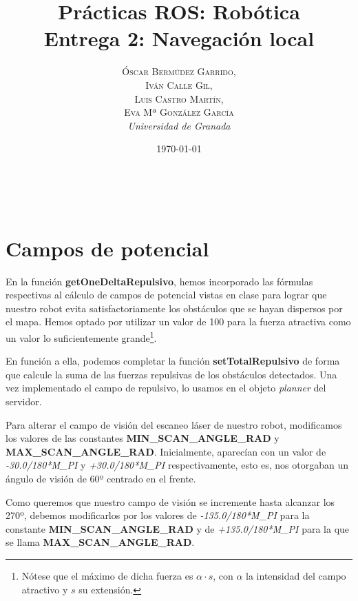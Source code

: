 \documentclass[a4paper, 11pt]{article}
\title{\textbf{Prácticas ROS: Robótica}\\ %
Entrega 2: Navegación local} %
\author{\textsc{Óscar Bermúdez Garrido,\\Iván Calle Gil,\\ Luis Castro Martín,\\ Eva Mª González García} %
\\{\textit{Universidad de Granada}}} %
\date{\today} %
\makeatletter
\renewcommand{\maketitle}{
  \begin{flushright} %
  
  {\LARGE\@title} %
  
  \vspace{50pt} %
  
  {\large\@author} %
  \\\@date %
  \vspace{40pt} %
  \end{flushright}
}
\makeatother
\begin{document}
\maketitle %

\renewcommand{\abstractname}{Resumen} %
\begin{abstract}
	
\end{abstract}


{\parskip=2pt
  \tableofcontents
}
\pagebreak


\section{Campos de potencial}
	En la función \textbf{getOneDeltaRepulsivo}, hemos incorporado las fórmulas respectivas al cálculo
	de campos de potencial vistas en clase para lograr que nuestro robot evita satisfactoriamente los
	obstáculos que se hayan dispersos por el mapa. Hemos optado por utilizar un valor de 100  para
	la fuerza atractiva como un valor lo suficientemente grande\footnote{Nótese que el máximo de dicha
	fuerza es $\alpha \cdot s$, con $\alpha$ la intensidad del campo atractivo y $s$ su extensión.}.
	
	En función a ella, podemos completar la función \textbf{setTotalRepulsivo} de forma que calcule la
	suma de las fuerzas repulsivas de los obstáculos detectados. Una vez implementado el campo de repulsivo,
	lo usamos en el objeto \textit{planner} del servidor.
	
	Para alterar el campo de visión del escaneo láser de nuestro robot, modificamos los valores de las
	constantes \textbf{MIN\_SCAN\_ANGLE\_RAD} y \textbf{MAX\_SCAN\_ANGLE\_RAD}. Inicialmente, aparecían
	con un valor de \textit{-30.0/180*M\_PI} y \textit{+30.0/180*M\_PI} respectivamente, esto es, nos
	otorgaban un ángulo de visión de 60º centrado en el frente.
	
	Como queremos que nuestro campo de visión se incremente hasta alcanzar los 270º, debemos modificarlos
	por los valores de \textit{-135.0/180*M\_PI} para la constante \textbf{MIN\_SCAN\_ANGLE\_RAD} y de
	\textit{+135.0/180*M\_PI} para la que se llama \textbf{MAX\_SCAN\_ANGLE\_RAD}.
	
\end{document}
